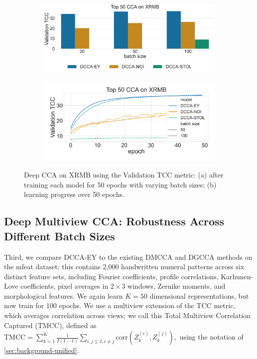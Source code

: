 \begin{figure}
    \centering
    \begin{subfigure}[b]{0.49\textwidth}
        \centering
        \includegraphics[width=\textwidth]{figures/DCCA/XRMB_models_different_batch_sizes}
        \caption{}
        \label{fig:corr_xrmb}
    \end{subfigure}
    \hfill
    \begin{subfigure}[b]{0.49\textwidth}
        \centering
        \includegraphics[width=\textwidth]{figures/DCCA/XRMB_allbatchsizes_pcc}
        \caption{}
        \label{fig:lr_xrmb}
    \end{subfigure}
    \caption{Deep CCA on XRMB using the Validation TCC metric: (a) after training each model for 50 epochs with varying batch sizes; (b) learning progress over 50 epochs.}
    \label{fig: xrmb}
\end{figure}

\subsection{Deep Multiview CCA: Robustness Across Different Batch Sizes}
Third, we compare DCCA-EY to the existing DMCCA and DGCCA methods on the mfeat dataset; this contains 2,000 handwritten numeral patterns across six distinct feature sets, including Fourier coefficients, profile correlations, Karhunen-Love coefficients, pixel averages in \(2 \times 3\) windows, Zernike moments, and morphological features. We again learn $K=50$ dimensional representations, but now train for 100 epochs.
We use a multiview extension of the TCC metric, which averages correlation across views; we call this Total Multiview Correlation Captured (TMCC), defined as \(
\text{TMCC} = \sum_{k=1}^{K} \frac{1}{I(I-1)} \sum_{i,j \leq I, i\neq j} \text{corr}(Z_k^{(i)}, Z_k^{(j)}),
\) %
using the notation of \cref{sec:background-unified}.

